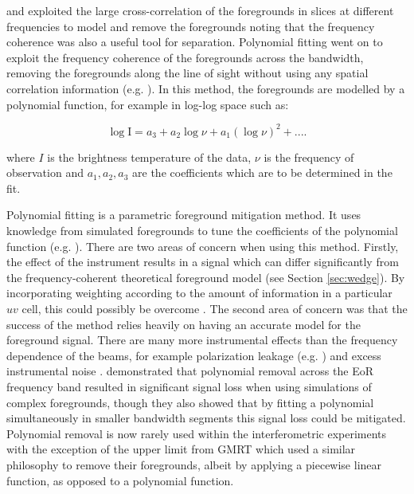 \citet{Santos2005ApJ...625..575S} and \citet{Zal2004ApJ...608..622Z} exploited the large cross-correlation of the foregrounds in slices at different frequencies to model and remove the foregrounds noting that the frequency coherence was also a useful tool for separation. Polynomial fitting went on to exploit the frequency coherence of the foregrounds across the bandwidth, removing the foregrounds along the line of sight without using any spatial correlation information (e.g. \citet{Bowman2009ApJ...695..183B,Wang2006ApJ...650..529W,Mcquinn2006ApJ...653..815M}). In this method, the foregrounds are modelled by a polynomial function, for example in log-log space such as:

\begin{equation}
\mathrm{\log I} = a_3 +a_2\log\nu + a_1(\log \nu)^2 + ....
\end{equation}

\noindent where $I$ is the brightness temperature of the data, $\nu$ is the frequency of observation and $a_1,a_2,a_3$ are the coefficients which are to be determined in the fit.

Polynomial fitting is a parametric foreground mitigation method. It uses knowledge from simulated foregrounds to tune the coefficients of the polynomial function (e.g. \citet{Jelic2008MNRAS.389.1319J}). There are two areas of concern when using this method. Firstly, the effect of the instrument results in a signal which can differ significantly from the frequency-coherent theoretical foreground model (see Section \ref{sec:wedge}). By incorporating weighting according to the amount of information in a particular $uv$ cell, this could possibly be overcome \citep{Liu2009MNRAS.398..401L,Bowman2009ApJ...695..183B}. The second area of concern was that the success of the method relies heavily on having an accurate model for the foreground signal. There are many more instrumental effects than the frequency dependence of the beams, for example polarization leakage (e.g. \citet{Nunhokee2017ApJ...848...47N,Asad2015MNRAS.451.3709A}) and excess instrumental noise \citep{Patil2016MNRAS.463.4317P}. \citet{Wang2013ApJ...763...90W} demonstrated that polynomial removal across the EoR frequency band resulted in significant signal loss when using simulations of complex foregrounds, though they also showed that by fitting a polynomial simultaneously in smaller bandwidth segments this signal loss could be mitigated. Polynomial removal is now rarely used within the interferometric experiments with the exception of the upper limit from GMRT \citep{Paciga2011MNRAS.413.1174P} which used a similar philosophy to remove their foregrounds, albeit by applying a piecewise linear function, as opposed to a polynomial function. 

